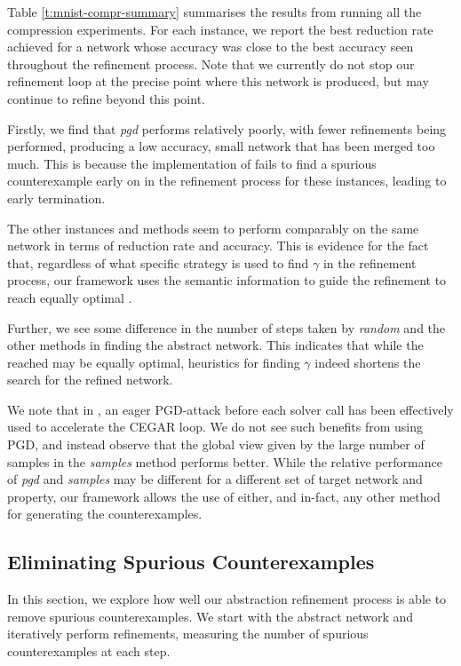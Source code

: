 Table \ref{t:mnist-compr-summary} summarises the results from running all the
\mnist compression experiments. For each instance, we report the best reduction
rate achieved for a network whose accuracy was close to the best accuracy seen
throughout the refinement process. Note that we currently do not stop our
refinement loop at the precise point where this network is produced, but may
continue to refine beyond this point.

Firstly, we find that \textit{pgd} performs relatively poorly, with fewer
refinements being performed, producing a low accuracy, small network that has
been merged too much. This is because the \abcrown
implementation of \pgd fails to find a spurious counterexample early on in the
refinement process for these instances, leading to early termination. 

The other instances and methods seem to perform
comparably on the same network in terms of reduction rate and accuracy. This is
evidence for the fact that, regardless of what specific strategy is used to
find $\gamma$ in the refinement process, our framework uses the
semantic information to guide the refinement to reach equally optimal \abs.

Further, we see some difference in the number of steps taken by \textit{random}
and the other methods in finding the abstract network. This indicates that while
the \abs reached may be equally optimal, 
heuristics for finding $\gamma$ indeed
shortens the search for the refined network.

We note that in \cite{cleverest-nn}, an eager PGD-attack before each solver call
has been effectively used to accelerate the CEGAR loop. We do not see such
benefits from using PGD, and instead observe that the global view given by
the large number of samples in the \textit{samples} method performs better.
While the relative performance of \textit{pgd} and \textit{samples} may be
different for a different set of target network and property, our framework
allows the use of either, and in-fact, any other method for generating the
counterexamples.

\subsection{Eliminating Spurious Counterexamples}
\label{s:exp-mnist-rob}

In this section, we explore how well our abstraction refinement process is able
to remove spurious counterexamples. We start with the abstract network and
iteratively perform refinements, measuring the number of spurious
counterexamples at each step. 

